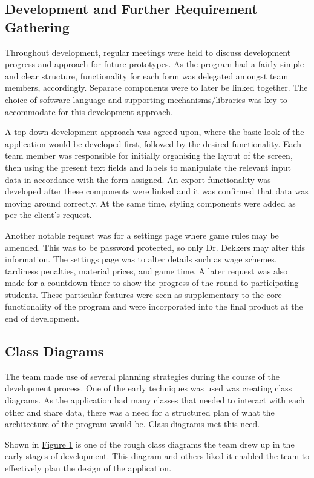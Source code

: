 \documentclass{l3proj}
\begin{document}
\subsection{Development and Further Requirement Gathering}
Throughout development, regular meetings were held to discuss development progress and approach for future prototypes. As the program had a fairly simple and clear structure, functionality for each form was delegated amongst team members, accordingly. Separate components were to later be linked together. The choice of software language and supporting mechanisms/libraries was key to accommodate for this development approach.

A top-down development approach was agreed upon, where the basic look of the application would be developed first, followed by the desired functionality. Each team member was responsible for initially organising the layout of the screen, then using the present text fields and labels to manipulate the relevant input data in accordance with the form assigned. An export functionality was developed after these components were linked and it was confirmed that data was moving around correctly. At the same time, styling components were added as per the client's request.

Another notable request was for a settings page where game rules may be amended. This was to be password protected, so only Dr. Dekkers may alter this information. The settings page was to alter details such as wage schemes, tardiness penalties, material prices, and game time. A later request was also made for a countdown timer to show the progress of the round to participating students.  These particular features were seen as supplementary to the core functionality of the program and were incorporated into the final product at the end of development.

\subsection{Class Diagrams}
The team made use of several planning strategies during the course of the development process. One of the early techniques was used was creating class diagrams. As the application had many classes that needed to interact with each other and share data, there was a need for a structured plan of what the architecture of the program would be. Class diagrams met this need.



Shown in \hyperref[fig:class]{Figure 1} is one of the rough class diagrams the team drew up in the early stages of development. This diagram and others liked it enabled the team to effectively plan the design of the application.
\end{document}
